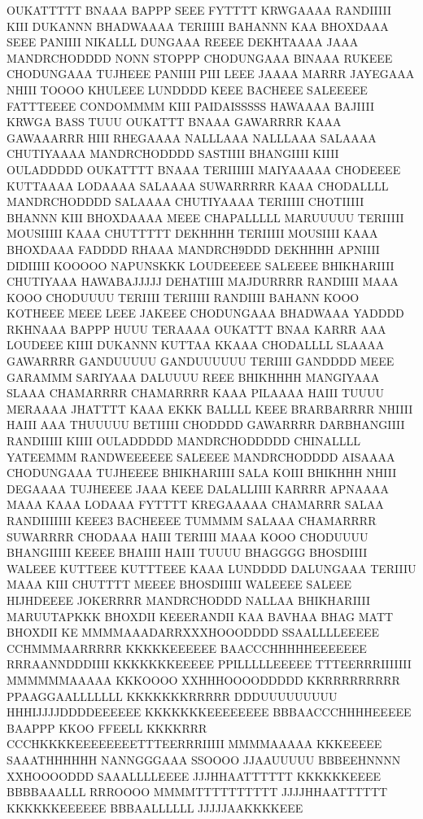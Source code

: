 OUKATTTTT BNAAA BAPPP SEEE FYTTTT KRWGAAAA 
RANDIIIII KIII DUKANNN BHADWAAAA 
TERIIIII BAHANNN KAA BHOXDAAA SEEE PANIIII NIKALLL DUNGAAA REEEE
DEKHTAAAA JAAA MANDRCHODDDD NONN STOPPP CHODUNGAAA
BINAAA RUKEEE CHODUNGAAA TUJHEEE 
PANIIII PIII LEEE JAAAA MARRR JAYEGAAA NHIII TOOOO
KHULEEE LUNDDDD KEEE BACHEEE SALEEEEE
FATTTEEEE CONDOMMMM KIII PAIDAISSSSS
HAWAAAA BAJIIII KRWGA BASS TUUU OUKATTT BNAAA
GAWARRRR KAAA GAWAAARRR HIII RHEGAAAA NALLLAAA 
NALLLAAA SALAAAA CHUTIYAAAA MANDRCHODDDD
SASTIIII BHANGIIII KIIII OULADDDDD OUKATTTT BNAAA
TERIIIIII MAIYAAAAA CHODEEEE KUTTAAAA LODAAAA SALAAAA
SUWARRRRR KAAA CHODALLLL MANDRCHODDDD SALAAAA CHUTIYAAAA
TERIIIII CHOTIIIII BHANNN KIII BHOXDAAAA MEEE CHAPALLLLL MARUUUUU
TERIIIII MOUSIIIII KAAA CHUTTTTT 
DEKHHHH TERIIIII MOUSIIII KAAA BHOXDAAA FADDDD RHAAA 
MANDRCH9DDD DEKHHHH APNIIII DIDIIIII KOOOOO NAPUNSKKK
LOUDEEEEE SALEEEE BHIKHARIIII CHUTIYAAA HAWABAJJJJJ 
DEHATIIII MAJDURRRR RANDIIII MAAA KOOO CHODUUUU TERIIII
TERIIIII RANDIIII BAHANN KOOO KOTHEEE MEEE LEEE JAKEEE CHODUNGAAA 
BHADWAAA YADDDD RKHNAAA BAPPP HUUU TERAAAA 
OUKATTT BNAA KARRR AAA 
LOUDEEE KIIII DUKANNN KUTTAA KKAAA CHODALLLL
SLAAAA GAWARRRR GANDUUUUU
GANDUUUUUU TERIIII GANDDDD MEEE GARAMMM SARIYAAA DALUUUU REEE 
BHIKHHHH MANGIYAAA SLAAA CHAMARRRR
CHAMARRRR KAAA PILAAAA HAIII TUUUU
MERAAAA JHATTTT KAAA EKKK BALLLL KEEE BRARBARRRR NHIIII HAIII 
AAA THUUUUU BETIIIII CHODDDD GAWARRRR
DARBHANGIIII RANDIIIII KIIII OULADDDDD
MANDRCHODDDDD CHINALLLL YATEEMMM RANDWEEEEEE SALEEEE MANDRCHODDDD
AISAAAA CHODUNGAAA TUJHEEEE BHIKHARIIII SALA KOIII BHIKHHH NHIII DEGAAAA TUJHEEEE
JAAA KEEE DALALLIIII KARRRR APNAAAA MAAA KAAA 
LODAAA FYTTTT KREGAAAAA CHAMARRR SALAA
RANDIIIIIII KEEE3 BACHEEEE TUMMMM SALAAA CHAMARRRR
SUWARRRR CHODAAA HAIII TERIIII MAAA KOOO CHODUUUU
BHANGIIIII KEEEE BHAIIII HAIII TUUUU
BHAGGGG BHOSDIIII WALEEE KUTTEEE
KUTTTEEE KAAA LUNDDDD DALUNGAAA TERIIIU MAAA KIII CHUTTTT MEEEE 
BHOSDIIIII WALEEEE SALEEE HIJHDEEEE JOKERRRR MANDRCHODDD NALLAA BHIKHARIIII
MARUUTAPKKK BHOXDII KEEERANDII KAA BAVHAA BHAG MATT BHOXDII KE
MMMMAAADARRXXXHOOODDDD SSAALLLLEEEEE CCHMMMAARRRRR 
KKKKKEEEEEE BAACCCHHHHHEEEEEEE
RRRAANNDDDIIII KKKKKKKEEEEE 
PPILLLLLEEEEE TTTEERRRIIIIIII
MMMMMMAAAAA KKKOOOO XXHHHOOOODDDDD 
KKRRRRRRRRR PPAAGGAALLLLLLL 
KKKKKKKRRRRR DDDUUUUUUUUU HHHIJJJJDDDDEEEEEE KKKKKKKEEEEEEEE 
BBBAACCCHHHHEEEEE BAAPPP KKOO 
FFEELL KKKKRRR CCCHKKKKEEEEEEEETTTEERRRIIIII MMMMAAAAA KKKEEEEE 
SAAATHHHHHH NANNGGGAAA SSOOOO JJAAUUUUU
BBBEEHNNNN XXHOOOODDD SAAALLLLEEEE JJJHHAATTTTTT 
KKKKKKEEEE BBBBAAALLL RRROOOO MMMMTTTTTTTTTT
JJJJHHAATTTTTT KKKKKKEEEEEE BBBAALLLLLL JJJJJAAKKKKEEE 
